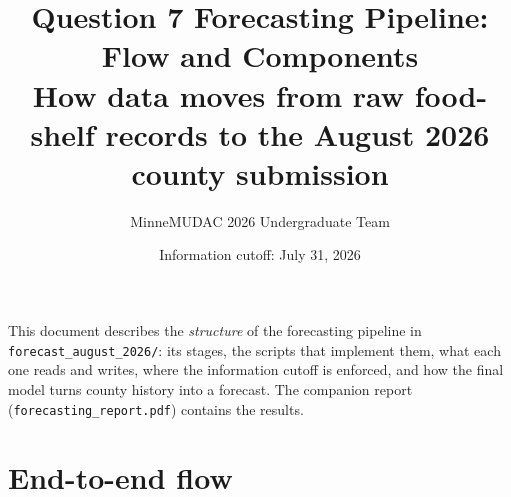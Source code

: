 \documentclass[11pt,letterpaper]{article}
\title{Question 7 Forecasting Pipeline: Flow and Components\\[2pt]
\large How data moves from raw food-shelf records to the August 2026 county submission}
\author{MinneMUDAC 2026 Undergraduate Team}
\date{Information cutoff: July 31, 2026}
\begin{document}
\maketitle
\sloppy

\noindent This document describes the \emph{structure} of the forecasting pipeline in
\texttt{forecast\_august\_2026/}: its stages, the scripts that implement them, what each one reads
and writes, where the information cutoff is enforced, and how the final model turns county history
into a forecast. The companion report (\texttt{forecasting\_report.pdf}) contains the results.

\section{End-to-end flow}
\end{document}
